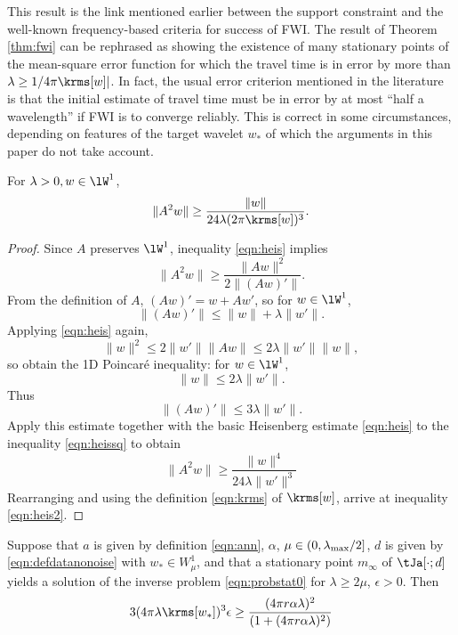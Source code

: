  This result is the link mentioned earlier between the support
constraint and the well-known frequency-based criteria for success of
FWI. The result of Theorem \ref{thm:fwi} can be rephrased as showing the
existence of many stationary points of the mean-square error function
for which the travel time is in error by more than
$\lambda \ge 1/{4 \pi \krms[w]|}$. In fact, the usual error criterion mentioned in the
literature is that the initial estimate of travel time must be in error by at most ``half a
wavelength'' if FWI is to converge reliably. This is correct in some
circumstances, depending on features of the target wavelet $w_*$ of
which the arguments in this paper do not take account.

\begin{proposition}
  \label{thm:heis2}
  For $\lambda>0, w \in \lW^1$,
  \begin{equation}
    \label{eqn:heis2}
    \|A^2w\| \ge \frac{\|w\|}{24 \lambda (2\pi\krms[w])^3}.
  \end{equation}
\end{proposition}

\begin{proof}
  Since $A$  preserves $\lW^1$, inequality \ref{eqn:heis} implies
  \begin{equation}
    \label{eqn:heissq}
    \|A^2w\| \ge \frac{\|Aw\|^2}{2\|(Aw)'\|}.
  \end{equation}
  From the definition of $A$, $(Aw)'=w +Aw'$, so for $w \in \lW^1$,
  \[
    \|(Aw)'\| \le \|w\|+ \lambda\|w'\|.
  \]
  Applying \ref{eqn:heis} again,
  \[
    \|w\|^2 \le 2\|w'\|\|Aw\|\le 2\lambda \|w'\|\|w\|,
  \]
  so obtain the 1D Poincar\'{e} inequality: for $w \in \lW^1$,
  \[
    \|w\| \le 2\lambda\|w'\|.
  \]
  Thus
  \[
    \|(Aw)'\| \le 3\lambda\|w'\|.
  \]
  Apply this estimate together with the basic Heisenberg estimate
  \ref{eqn:heis} to the inequality \ref{eqn:heissq} to obtain
  \[
    \|A^2w\| \ge \frac{\|w\|^4}{24\lambda \|w'\|^3}
  \]
  Rearranging and using the definition \ref{eqn:krms} of $\krms[w]$,
  arrive at inequality \ref{eqn:heis2}.
\end{proof}

\begin{theorem}
  \label{thm:ipnonoisenec}
  Suppose that $a$ is given by definition \ref{eqn:ann}, $\alpha$,
  $\mu \in (0,\lambda_{\rm max}/2]$, $d$ is given by
  \ref{eqn:defdatanonoise} with $w_* \in W_{\mu}^1$, and that a
  stationary point $m_{\infty}$ of $\tJa[\cdot;d]$ yields a solution
  of the inverse problem \ref{eqn:probstat0} for $\lambda \ge 2\mu$,
  $\epsilon>0$. Then
\begin{equation}
  \label{eqn:epsalpha}
  3 (4\pi \lambda \krms[w_*])^3 \epsilon \ge \frac{(4\pi  r\alpha\lambda)^2}
  {(1+(4\pi r \alpha \lambda)^2)}
\end{equation}
\end{theorem}

